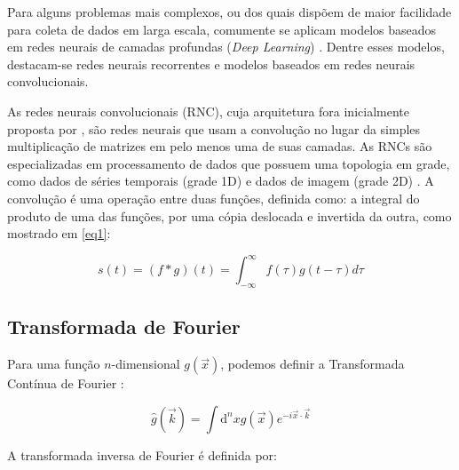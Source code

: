 \documentclass[conference,compsoc]{IEEEtran}
\newcommand{\dd}{\mathrm{d}} %
\begin{document}
Para alguns problemas mais complexos, ou dos quais dispõem de maior facilidade para coleta de dados em larga escala, comumente se aplicam modelos baseados em redes neurais de camadas profundas (\textit{Deep Learning}) \cite{lecun2015deep}. Dentre esses modelos, destacam-se redes neurais recorrentes \cite{mikolov2010recurrent} e modelos baseados em redes neurais convolucionais.

As redes neurais convolucionais (RNC), cuja arquitetura fora inicialmente proposta por \cite{lecun1998gradient}, são redes neurais que usam a convolução no lugar da simples multiplicação de matrizes em pelo menos uma de suas camadas. As RNCs são especializadas em processamento de dados que possuem uma topologia em grade, como dados de séries temporais (grade 1D) e dados de imagem (grade 2D) \cite{goodfellow2016deep}. A convolução é uma operação entre duas funções, definida como: a integral do produto de uma das funções, por uma cópia deslocada e invertida da outra, como mostrado em \ref{eq1}:

\begin{equation}\label{eq1}
s(t) = (f * g)(t) = \int_{-\infty}^{\infty} f(\tau)g(t - \tau) d\tau
\end{equation}

\subsection{Transformada de Fourier}

Para uma função $n$-dimensional $g(\vec x)$, podemos definir a Transformada Contínua de Fourier \cite{anandbrief}:

\begin{equation}
  \label{ft_continuous}
  \hat{g}(\vec k) = \int \dd^nx g(\vec x)e^{-i\vec x\cdot \vec k}
\end{equation}

A transformada inversa de Fourier é definida por:

\end{document}
